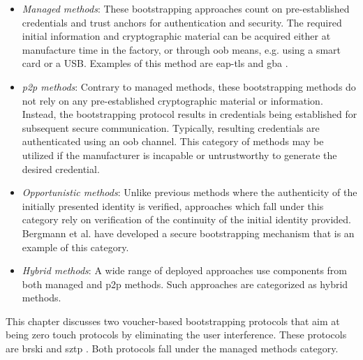 \begin{itemize}
	\item \textit{Managed methods}: These bootstrapping approaches count on pre-established credentials and trust anchors for authentication and security. The required initial information and cryptographic material can be acquired either at manufacture time in the factory, or through \gls{oob} means, e.g. using a smart card or a USB. Examples of this method are \gls{eap-tls} \cite{eap-tls} and \gls{gba} \cite{gba}.
	
	\item \textit{\gls{p2p} methods}: Contrary to managed methods, these bootstrapping methods do not rely on any pre-established cryptographic material or information. Instead, the bootstrapping protocol results in credentials being established for subsequent secure communication. Typically, resulting credentials are authenticated using an \gls{oob} channel. This category of methods may be utilized if the manufacturer is incapable or untrustworthy to generate the desired credential.
	
	\item \textit{Opportunistic methods}: Unlike previous methods where the authenticity of the initially presented identity is verified, approaches which fall under this category rely on verification of the continuity of the initial identity provided. Bergmann et al. \cite{simplekeys} have developed a secure bootstrapping mechanism that is an example of this category. 
	
	\item \textit{Hybrid methods}: A wide range of deployed approaches use components from both managed and \gls{p2p} methods. Such approaches are categorized as hybrid methods.	
\end{itemize} 

This chapter discusses two voucher-based bootstrapping protocols that aim at being zero touch protocols by eliminating the user interference. These protocols are \gls{brski} \cite{brski} and \gls{sztp} \cite{sztp}. Both protocols fall under the managed methods category.




